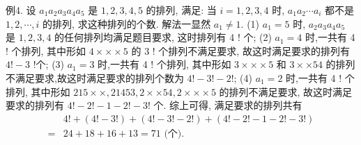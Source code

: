 例4. 设 $a_1 a_2 a_3 a_4 a_5$ 是 $1,2,3,4,5$ 的排列, 满足: 当 $i=1,2,3,4$ 时, $a_1 a_2 \cdots a_i$ 都不是 $1,2, \cdots, i$ 的排列, 求这种排列的个数.
解法一显然 $a_1 \neq 1$.
(1) $a_1=5$ 时, $a_2 a_3 a_4 a_5$ 是 $1,2,3,4$ 的任何排列均满足题目要求, 这时排列有 4 ! 个;
(2) $a_1=4$ 时,一共有 4 ! 个排列, 其中形如 $4 \times \times \times 5$ 的 3 ! 个排列不满足要求, 故这时满足要求的排列有 $4 !-3$ !个;
(3) $a_1=3$ 时,一共有 4 ! 个排列, 其中形如 $3 \times \times \times 5$ 和 $3 \times \times 54$ 的排列不满足要求,故这时满足要求的排列个数为 $4 !-3 !-2 !$;
(4) $a_1=2$ 时,一共有 4 ! 个排列, 其中形如 $215 \times \times, 21453,2 \times \times 54,2 \times \times \times 5$ 的排列不满足要求, 故这时满足要求的排列有 $4 !-2 !-1- 2 !-3 !$ 个.
综上可得, 满足要求的排列共有
$$
\begin{aligned}
& 4 !+(4 !-3 !)+(4 !-3 !-2 !)+(4 !-2 !-1-2 !-3 !) \\
= & 24+18+16+13=71 \text { (个). }
\end{aligned}
$$



